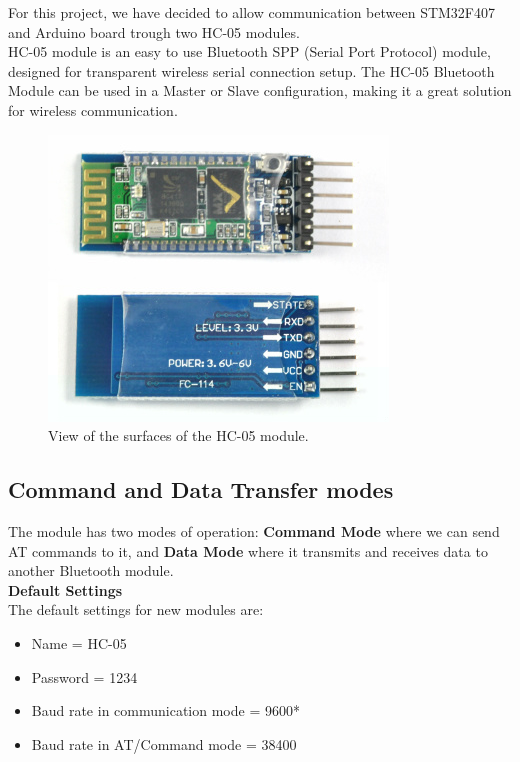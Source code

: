 \author{Yuri}
For this project, we have decided to allow communication between STM32F407 and Arduino board trough two HC-05 modules.\\
HC-05 module is an easy to use Bluetooth SPP (Serial Port Protocol) module, designed for transparent wireless serial connection setup. The HC-05 Bluetooth Module can be used in a Master or Slave configuration, making it a great solution for wireless communication.\\

\begin{figure}[H]
	\centering
	\includegraphics[width=\textwidth]
	{files/images/hc05_view}
	\caption{View of the surfaces of the HC-05 module.}
\end{figure}

\subsection{Command and Data Transfer modes}
The module has two modes of operation: \textbf{Command Mode} where we can send AT commands to it, and \textbf{Data Mode} where it transmits and receives data to another Bluetooth module.\\

\textbf{Default Settings}\\
The default settings for new modules are:
\begin{itemize}
\item Name = HC-05
\item Password = 1234
\item Baud rate in communication mode = 9600*
\item Baud rate in AT/Command mode = 38400
\end{itemize}

